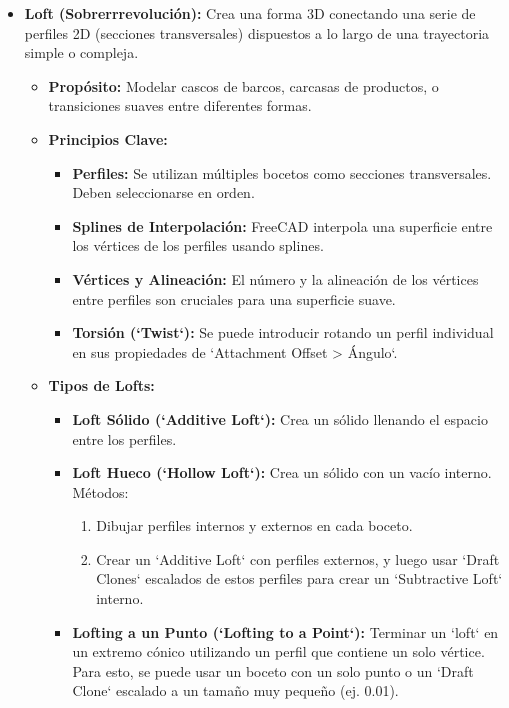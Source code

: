 \documentclass[12pt]{article}
\begin{document}
\begin{itemize}[label=\textbullet]
    \item \textbf{Loft (Sobrerrrevolución):} Crea una forma 3D conectando una serie de perfiles 2D (secciones transversales) dispuestos a lo largo de una trayectoria simple o compleja.
    \begin{itemize}[label=\textendash]
        \item \textbf{Propósito:} Modelar cascos de barcos, carcasas de productos, o transiciones suaves entre diferentes formas.
        \item \textbf{Principios Clave:}
        \begin{itemize}[label=\textendash]
            \item \textbf{Perfiles:} Se utilizan múltiples bocetos como secciones transversales. Deben seleccionarse en orden.
            \item \textbf{Splines de Interpolación:} FreeCAD interpola una superficie entre los vértices de los perfiles usando splines.
            \item \textbf{Vértices y Alineación:} El número y la alineación de los vértices entre perfiles son cruciales para una superficie suave.
            \item \textbf{Torsión (`Twist`):} Se puede introducir rotando un perfil individual en sus propiedades de `Attachment Offset > Ángulo`.
        \end{itemize}
        \item \textbf{Tipos de Lofts:}
        \begin{itemize}[label=\textendash]
            \item \textbf{Loft Sólido (`Additive Loft`):} Crea un sólido llenando el espacio entre los perfiles.
            \item \textbf{Loft Hueco (`Hollow Loft`):} Crea un sólido con un vacío interno. Métodos:
            \begin{enumerate}[label=\arabic*)]
                \item Dibujar perfiles internos y externos en cada boceto.
                \item Crear un `Additive Loft` con perfiles externos, y luego usar `Draft Clones` escalados de estos perfiles para crear un `Subtractive Loft` interno.
            \end{enumerate}
            \item \textbf{Lofting a un Punto (`Lofting to a Point`):} Terminar un `loft` en un extremo cónico utilizando un perfil que contiene un solo vértice. Para esto, se puede usar un boceto con un solo punto o un `Draft Clone` escalado a un tamaño muy pequeño (ej. 0.01).

\end{itemize}
\end{itemize}
\end{itemize}
\end{document}
